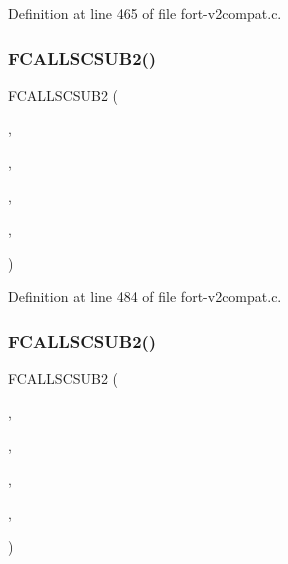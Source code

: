 Definition at line 465 of file fort-\/v2compat.\+c.

\mbox{\label{fort-v2compat_8c_a61c7c11d7478cfdb88af026f76f1f998}} 
\subsubsection{\texorpdfstring{F\+C\+A\+L\+L\+S\+C\+S\+U\+B2()}{FCALLSCSUB2()}\hspace{0.1cm}{\footnotesize\ttfamily [2/5]}}
{\footnotesize\ttfamily F\+C\+A\+L\+L\+S\+C\+S\+U\+B2 (\begin{DoxyParamCaption}\item[{\hyperlink{nf__v2compat_8c_a655af79e1ecf926fcfeb94536220fe6a}{c\+\_\+ncredf}}]{,  }\item[{N\+C\+R\+E\+DF}]{,  }\item[{\hyperlink{nf__fortv2_8f90_a162a5ab1076c10c2228e36ee9ff00677}{ncredf}}]{,  }\item[{N\+C\+ID}]{,  }\item[{\hyperlink{fort-v2compat_8c_ae2352f39cbd25bcaf1bedbbb12db73fe}{P\+R\+C\+O\+DE}}]{ }\end{DoxyParamCaption})}



Definition at line 484 of file fort-\/v2compat.\+c.

\mbox{\label{fort-v2compat_8c_a094afaf83de5e83ec91adc5b2f9f4a65}} 
\subsubsection{\texorpdfstring{F\+C\+A\+L\+L\+S\+C\+S\+U\+B2()}{FCALLSCSUB2()}\hspace{0.1cm}{\footnotesize\ttfamily [3/5]}}
{\footnotesize\ttfamily F\+C\+A\+L\+L\+S\+C\+S\+U\+B2 (\begin{DoxyParamCaption}\item[{\hyperlink{nf__v2compat_8c_afbb2553120ff113b73c14b2701f139ac}{c\+\_\+ncendf}}]{,  }\item[{N\+C\+E\+N\+DF}]{,  }\item[{\hyperlink{nf__fortv2_8f90_a0397fd550c269ff18340d1786e34d6f6}{ncendf}}]{,  }\item[{N\+C\+ID}]{,  }\item[{\hyperlink{fort-v2compat_8c_ae2352f39cbd25bcaf1bedbbb12db73fe}{P\+R\+C\+O\+DE}}]{ }\end{DoxyParamCaption})}




